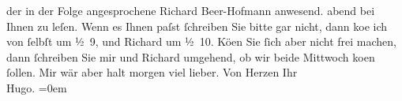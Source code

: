 \begin{ledgroupsized}[t]{13cm}
{{{                  der in der Folge angesprochene Richard
                     Beer-Hofmann anwesend.}}}\label{K_L00881_1h}{ }abend bei Ihnen zu leſen. Wenn es Ihnen paſst ſchreiben Sie bitte gar
               nicht, dann ko{\geminationm}e ich von ſelbſt um ½ 9, und
                  Richard um ½ 10. Kö{\geminationn}en Sie ſich aber nicht frei machen, dann ſchreiben Sie
               mir und Richard umgehend, ob wir beide
                  Mittwoch ko{\geminationm}en ſollen. Mir wär aber halt
               morgen viel lieber.\pend
           \pstart
           Von Herzen Ihr{\\[\baselineskip]}\spacefill\mbox{Hugo.}\pend
           \leftskip=0em{}
         
         \endnumbering{}\end{ledgroupsized}  \newcommand{\dateiname}{L00881}\newcommand{\titel}{Hugo von Hofmannsthal an Arthur Schnitzler, [16. 1. 1899]}\newcommand{\editorInnen}{Martin Anton Müller und Gerd-Hermann Susen}
      